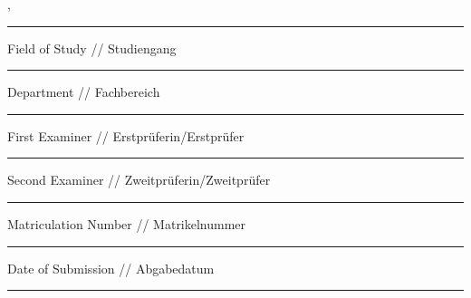 {\begin{titlepage}
			\vskip -0.15cm

			\begingroup
			\fontsize{12pt}{14pt}\selectfont
				{\@authorFirstname} {\@authorLastname}, {\@authorBirthplace}
			\endgroup
			\vskip -0.15cm

			\noindent\rule{15cm}{0.4pt}
			
			\vskip 0.05cm

			\begingroup
			\fontsize{8pt}{6pt}\selectfont
			Field of Study // Studiengang
			\endgroup

			\vskip -0.15cm

			\begingroup
			\fontsize{12pt}{14pt}\selectfont
				{\@courseOfStudies}
			\endgroup
			\vskip -0.15cm

			\noindent\rule{15cm}{0.4pt}
			
			\vskip 0.05cm

			\begingroup
			\fontsize{8pt}{6pt}\selectfont
			Department // Fachbereich
			\endgroup

			\vskip -0.15cm

			\begingroup
			\fontsize{12pt}{14pt}\selectfont
				{\@discipline}
			\endgroup
			\vskip -0.15cm

			\noindent\rule{15cm}{0.4pt}
			
			\vskip 0.05cm

			\begingroup
			\fontsize{8pt}{6pt}\selectfont
			First Examiner // Erstprüferin/Erstprüfer
			\endgroup

			\vskip -0.15cm

			\begingroup
			\fontsize{12pt}{14pt}\selectfont
				{\@firstExaminer}
			\endgroup
			\vskip -0.15cm

			\noindent\rule{15cm}{0.4pt}
			
			\vskip 0.05cm

			\begingroup
			\fontsize{8pt}{6pt}\selectfont
			Second Examiner // Zweitprüferin/Zweitprüfer
			\endgroup

			\vskip -0.15cm

			\begingroup
			\fontsize{12pt}{14pt}\selectfont
				{\@secondExaminer}
			\endgroup
			\vskip -0.15cm

			\noindent\rule{15cm}{0.4pt}
			
			\vskip 0.05cm

			\begingroup
			\fontsize{8pt}{6pt}\selectfont
			Matriculation Number // Matrikelnummer
			\endgroup

			\vskip -0.15cm

			\begingroup
			\fontsize{12pt}{14pt}\selectfont
				{\@matrikelnr}
			\endgroup
			\vskip -0.15cm

			\noindent\rule{15cm}{0.4pt}

			\vskip 0.05cm

			\begingroup
			\fontsize{8pt}{6pt}\selectfont
			Date of Submission // Abgabedatum
			\endgroup

			\vskip -0.15cm

			\begingroup
			\fontsize{12pt}{14pt}\selectfont
				{\@submitDate}
			\endgroup
			\vskip -0.15cm

			\noindent\rule{15cm}{0.4pt}
		\restoregeometry
	\end{titlepage}
}
\makeatother
